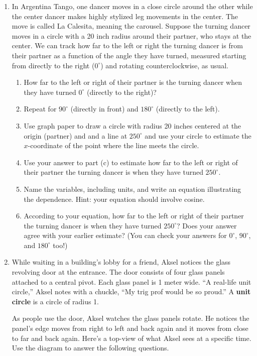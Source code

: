 \begin{enumerate}
\item %
In Argentina Tango, one dancer moves in a close circle around the other while the center dancer makes highly stylized leg movements in the center. The move is called La Calesita, meaning the carousel. Suppose the turning dancer moves in a circle with a 20 inch radius around their partner, who stays at the center. We can track how far to the left or right the turning dancer is from their partner as a function of the angle they have turned, measured starting from directly to the right ($0^\circ$) and rotating counterclockwise, as usual.
\begin{enumerate}
    \item How far to the left or right of their partner is the turning dancer when they have turned $0^\circ$ (directly to the right)?
    \item Repeat for $90^\circ$ (directly in front) and $180^\circ$ (directly to the left).
    \item Use graph paper to draw a circle with radius 20 inches centered at the origin (partner) and and a line at $250^\circ$ and use your circle to estimate the $x$-coordinate of the point where the line meets the circle.
    \item Use your answer to part (c) to estimate how far to the left or right of their partner the turning dancer is when they have turned $250^\circ$.  
    \item Name the variables, including units, and write an equation illustrating the dependence.  Hint: your equation should involve cosine. 
    \item According to your equation, how far to the left or right of their partner the turning dancer is when they have turned $250^\circ$? Does your answer agree with your earlier estimate?  (You can check your answers for $0^\circ$, $90^\circ$, and $180^\circ$ too!)
\end{enumerate}

\item %
While waiting in a building's lobby for a friend, Aksel notices the glass revolving door at the entrance. The door consists of four glass panels attached to a central pivot.  Each glass panel is 1 meter wide. ``A real-life unit circle,'' Aksel notes with a chuckle,  ``My trig prof would be so proud.''  A \textbf{unit circle} is a circle of radius 1.

As people use the door, Aksel watches the glass panels rotate.  He notices the panel's edge moves from right to left and back again and it moves from close to far and back again.  Here's a top-view of what Aksel sees at a specific time.  Use the diagram to answer the following questions.


\end{enumerate}
